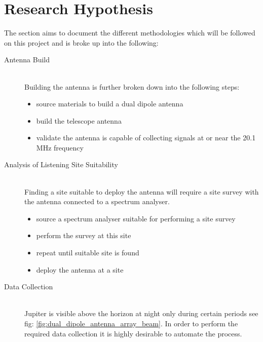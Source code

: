 \documentclass[runningheads,a4paper]{llncs}
\begin{document}
%
%
\newpage
\section*{Research Hypothesis}

The section aims to document the different methodologies which will be followed on this project and is broke up into the following:


\begin{description}
  \item[Antenna Build] \hfill \\
    Building the antenna is further broken down into the following steps:
    \begin{itemize}
      \item source materials to build a dual dipole antenna
      \item build the telescope antenna
      \item validate the antenna is capable of collecting signals at or near the 20.1 MHz frequency \\
    \end{itemize}
  \item [Analysis of Listening Site Suitability] \hfill \\
    Finding a site suitable to deploy the antenna will require a site survey with the antenna connected to a spectrum analyser.
    \begin{itemize}
      \item source a spectrum analyser suitable for performing a site survey
      \item perform the survey at this site
      \item repeat until suitable site is found 
      \item deploy the antenna at a site \\
    \end{itemize}
  \item [Data Collection] \hfill \\
    Jupiter is visible above the horizon at night only during certain periods see fig: \ref{fig:dual_dipole_antenna_array_beam}. In order to perform the required data collection it is highly desirable to automate the process.
    \begin{itemize}

\end{itemize}
\end{description}
\end{document}
